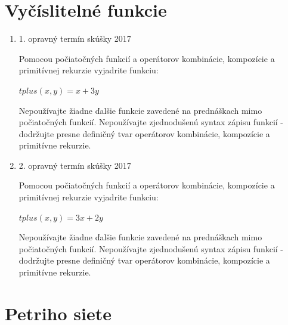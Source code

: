\documentclass[11pt,a4paper]{article}
\begin{document}
	\section{Vyčíslitelné funkcie}

	\begin{enumerate}
		\item 1. opravný termín skúšky 2017

		Pomocou počiatočných funkcií a operátorov kombinácie, kompozície a primitívnej rekurzie vyjadrite funkciu:

		$tplus(x,y) = x + 3y$

		Nepoužívajte žiadne ďalšie funkcie zavedené na prednáškach mimo počiatočných funkcií. Nepoužívajte zjednodušenú syntax zápisu funkcií \-- dodržujte presne definičný tvar operátorov kombinácie, kompozície a primitívne rekurzie.

		\item 2. opravný termín skúšky 2017

		Pomocou počiatočných funkcií a operátorov kombinácie, kompozície a primitívnej rekurzie vyjadrite funkciu:

		$tplus(x,y) = 3x + 2y$

		Nepoužívajte žiadne ďalšie funkcie zavedené na prednáškach mimo počiatočných funkcií. Nepoužívajte zjednodušenú syntax zápisu funkcií \-- dodržujte presne definičný tvar operátorov kombinácie, kompozície a primitívne rekurzie.
	\end{enumerate}

	\section{Petriho siete}
\end{document}
